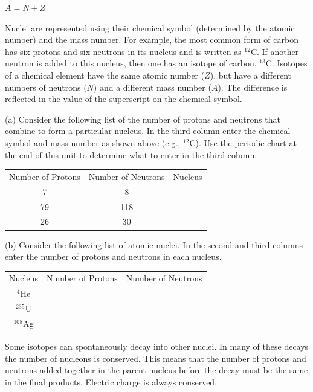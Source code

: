 {\centering $A = N + Z$\par}

Nuclei are represented using their chemical symbol (determined by
the atomic number) and the mass number. For example, the most common
form of carbon has six protons and six neutrons in its nucleus and
is written as \( ^{12} \)C. If another neutron is added to this nucleus,
then one has an isotope of carbon, \( ^{13} \)C. Isotopes of a chemical element
have the same atomic number ($Z$), but have a different numbers of neutrons
($N$) and a different mass number ($A$). The difference is reflected in
the value of the superscript on the chemical symbol.

(a) Consider the following list of the number of protons and neutrons
that combine to form a particular nucleus. In the third column enter the chemical
symbol and mass number as shown above (e.g., \( ^{12} \)C). Use the
periodic chart at the end of this unit to determine what to enter in the third
column.

\vspace{0.3cm}
{\renewcommand{\arraystretch}{1.1}
{\centering \begin{tabular}{|c|c|c|}
\hline 
Number of Protons&
Number of Neutrons&
Nucleus\\
\hhline{|=|=|=|}
7&
8&
\\
\hline 
79&
118&
\\
\hline 
26&
30&
\\
\hline
\end{tabular}\par}}
\vspace{0.3cm}

(b) Consider the following list of atomic nuclei. In the second and
third columns enter the number of protons and neutrons in each nucleus.

\vspace{0.3cm}
{\renewcommand{\arraystretch}{1.2}
{\centering \begin{tabular}{|c|c|c|}
\hline 
Nucleus&
Number of Protons&
Number of Neutrons\\
\hhline{|=|=|=|}
\( ^{4} \)He&
&
\\
\hline 
\( ^{235} \)U&
&
\\
\hline 
\( ^{108} \)Ag&
&
\\
\hline
\end{tabular}\par}}
\vspace{0.3cm}

Some isotopes can spontaneously decay into other nuclei.
In many of these decays the number of nucleons is conserved. 
This
means that the number of protons and neutrons added together in the parent nucleus before
the decay must be the same in the final products.
Electric charge
is always conserved.

